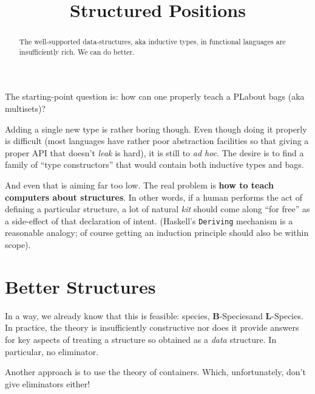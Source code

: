 \documentclass{article} %
\title{Structured Positions}
\author{}
\theoremstyle{plain}
\theoremstyle{definition}
\newcommand{\PL}{PL} %
\newcommand{\BSp}{\(\mathbf{B}\)-Species}
\newcommand{\LSp}{\(\mathbf{L}\)-Species}
\begin{document}
\maketitle
\begin{abstract}
The well-supported data-structures, aka inductive types, in functional
languages are insufficiently rich. We can do better.
\end{abstract}

The starting-point question is: how can one properly teach a \PL about
bags (aka multisets)?

Adding a single new type is rather boring though. Even though doing it
properly is difficult (most languages have rather poor abstraction facilities
so that giving a proper API that doesn't \emph{leak} is hard), it is still
to \textit{ad hoc}. The desire is to find a family of ``type constructors''
that would contain both inductive types and bags.

And even that is aiming far too low. The real problem is 
\textbf{how to teach computers about structures}. In other words, if a
human performs the act of defining a particular structure, a lot of
natural \emph{kit} should come along ``for free'' as a side-effect of
that declaration of intent. (Haskell's \texttt{Deriving} mechanism is
a reasonable analogy; of course getting an induction principle should also
be within scope).

\section{Better Structures}

In a way, we already know that this is  feasible:
species, \BSp and \LSp. In practice, the theory is insufficiently
constructive nor does it provide answers for key aspects of treating
a structure so obtained as a \emph{data} structure. In particular, no
eliminator.

Another approach is to use the theory of containers. Which, unfortunately,
don't give eliminators either!
\end{document}

